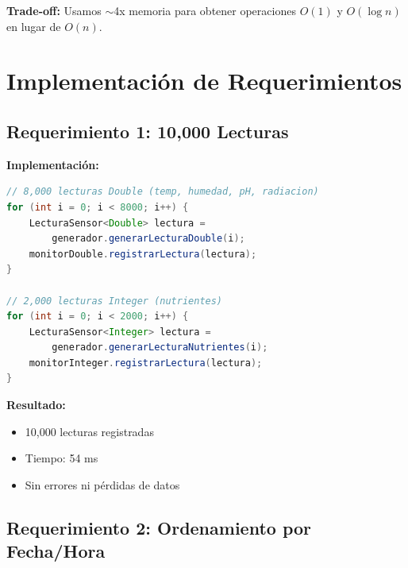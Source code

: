 \documentclass[12pt,a4paper]{article}
\begin{document}
\textbf{Trade-off:} Usamos $\sim$4x memoria para obtener operaciones $O(1)$ y $O(\log n)$ en lugar de $O(n)$.


\section{Implementación de Requerimientos}

\subsection{Requerimiento 1: 10,000 Lecturas}

\begin{tcolorbox}[colback=green!5,colframe=green!75!black,title=Cumplido]
\textbf{Implementación:}

\begin{lstlisting}[language=Java]
// 8,000 lecturas Double (temp, humedad, pH, radiacion)
for (int i = 0; i < 8000; i++) {
    LecturaSensor<Double> lectura = 
        generador.generarLecturaDouble(i);
    monitorDouble.registrarLectura(lectura);
}

// 2,000 lecturas Integer (nutrientes)
for (int i = 0; i < 2000; i++) {
    LecturaSensor<Integer> lectura = 
        generador.generarLecturaNutrientes(i);
    monitorInteger.registrarLectura(lectura);
}
\end{lstlisting}

\textbf{Resultado:}
\begin{itemize}
    \item[$\bullet$] 10,000 lecturas registradas
    \item[$\bullet$] Tiempo: 54 ms
    \item[$\bullet$] Sin errores ni pérdidas de datos
\end{itemize}
\end{tcolorbox}

\subsection{Requerimiento 2: Ordenamiento por Fecha/Hora}
\end{document}
